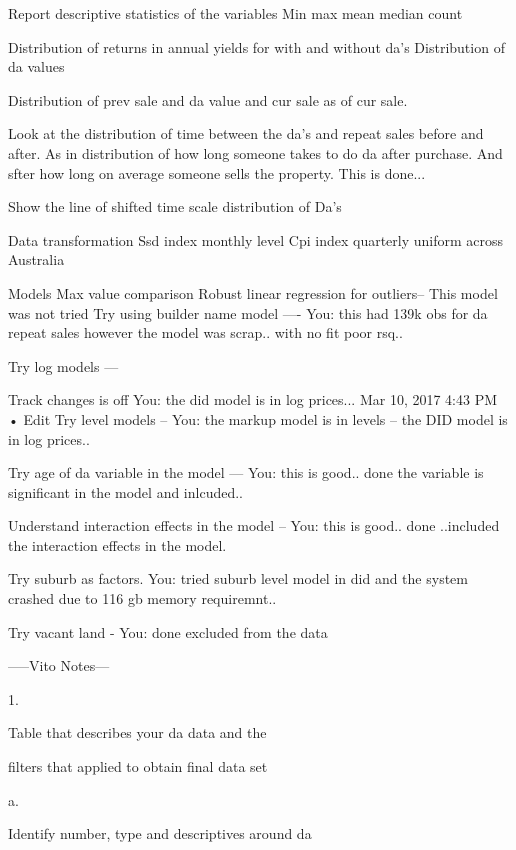 Report descriptive statistics of the variables 
Min max mean median count 



Distribution of returns in annual yields for with and without da's
Distribution of da values

Distribution of prev sale and da value and cur sale as of cur sale. 
    

Look at the distribution of time between the da's and repeat sales before and after. As in distribution of how long someone takes to do da after purchase. And sfter how long on average someone  sells the property. 
    This is done...
    

Show the line of shifted time scale distribution of Da's





Data transformation 
Ssd index monthly level
Cpi index quarterly uniform across Australia

Models
Max value comparison 
Robust linear regression for outliers-- 
        This model was not tried
Try using builder name model ---- 
        You: this had 139k obs for da repeat sales however the model was scrap.. with no fit poor rsq..

Try log models --- 
        
Track changes is off
You: the did model is in log prices...
Mar 10, 2017 4:43 PM • Edit
Try level models -- 
    You: the markup model is in levels -- the DID model is in log prices..

Try age of da variable in the model --- 
        You: this is good.. done the variable is significant in the model and inlcuded..

Understand interaction effects in the model --
    You: this is good.. done ..included the interaction effects in the model.

Try suburb as factors. 
    You: tried suburb level model in did and the system crashed due to 116 gb memory requiremnt..

Try vacant land - 
    You: done excluded from the data



-----Vito Notes---

1.     

Table that describes your da data and the

filters that applied to obtain final data set


a.     

Identify number, type and descriptives around da






